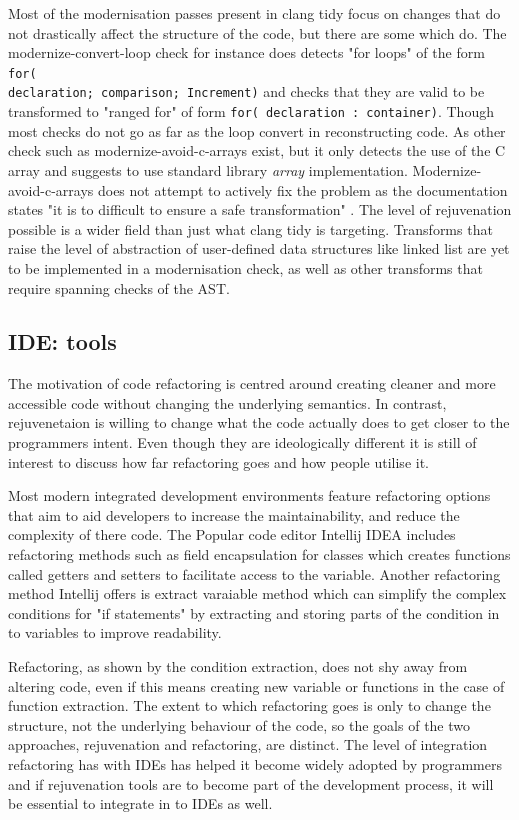 \documentclass[bsc,frontabs,singlespacing,parskip,deptreport]{infthesis}
\begin{document}
Most of the modernisation passes present in clang tidy focus on changes that do not drastically affect the structure of the code, but there are some which do. The modernize-convert-loop check \cite{FOR_CONVERT} for instance does detects "for loops" of the form \texttt{for( \\declaration; comparison; Increment)} and checks that they are valid to be transformed to "ranged for" of  form \texttt{for( declaration : container)}. Though most checks do not go as far as the loop convert in reconstructing code. As other check such as modernize-avoid-c-arrays \cite{ARRAY_CONVERT} exist, but it only detects the use of the C array and suggests to use standard library \textit{array} implementation. Modernize-avoid-c-arrays does not attempt to actively fix the problem as the documentation states "it is to difficult to ensure a safe transformation" \cite{ARRAY_CONVERT}. The level of rejuvenation possible is a wider field than just what clang tidy is targeting. Transforms that raise the level of abstraction of user-defined data structures like linked list are yet to be implemented in a modernisation check, as well as other transforms that require spanning checks of the AST.   

\subsection{IDE: tools}
The motivation of code refactoring is centred around creating cleaner and more accessible code without changing the underlying semantics. In contrast, rejuvenetaion is willing to change what the code actually does to get closer to the programmers intent. Even though they are ideologically different it is still of interest to discuss how far refactoring goes and how people utilise it.

Most modern integrated development environments feature refactoring options that aim to aid developers to increase the maintainability, and reduce the complexity of there code. The Popular code editor Intellij IDEA \cite{IDEA} includes refactoring methods such as field encapsulation \cite{IDEA_ENCAP} for classes which creates functions called getters and setters to facilitate access to the variable. Another refactoring method Intellij offers is extract varaiable \cite{IDEA_EXTRACT} method which can simplify the complex conditions for "if statements" by extracting and storing parts of the condition in to variables to improve readability.

Refactoring, as shown by the condition extraction, does not shy away from altering code, even if this means creating new variable or functions in the case of function extraction. The extent to which refactoring goes is only to change the structure, not the underlying behaviour of the code, so the goals  of the two approaches, rejuvenation and refactoring, are distinct. The level of integration refactoring has with IDEs has helped it become widely adopted by programmers and if rejuvenation tools are to become part of the development process, it will be essential to integrate in to IDEs as well.
\end{document}
